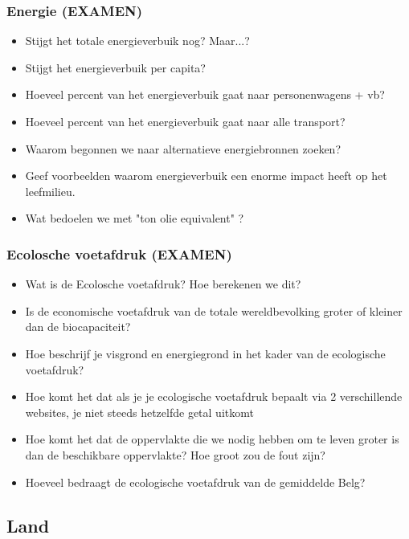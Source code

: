 \documentclass[12pt]{article}
\begin{document}
    \subsubsection*{Energie \textbf{(EXAMEN)}}
    \begin{itemize}
        \item Stijgt het totale energieverbuik nog? Maar...? 
        \item Stijgt het energieverbuik per capita?
        \item Hoeveel percent van het energieverbuik gaat naar personenwagens + vb?
        \item Hoeveel percent van het energieverbuik gaat naar alle transport?
        \item Waarom begonnen we naar alternatieve energiebronnen zoeken?
        \item Geef voorbeelden waarom energieverbuik een enorme impact heeft op het leefmilieu.
        \item Wat bedoelen we met "ton olie equivalent" ?
    \end{itemize}

    \subsubsection*{Ecolosche voetafdruk \textbf{(EXAMEN)}}
    \begin{itemize}
        \item Wat is de Ecolosche voetafdruk? Hoe berekenen we dit?
        \item Is de economische voetafdruk van de totale wereldbevolking groter of kleiner dan de biocapaciteit?
        \item Hoe beschrijf je visgrond en energiegrond in het kader van de ecologische voetafdruk?
        \item Hoe komt het dat als je je ecologische voetafdruk bepaalt via 2 verschillende websites, je niet steeds hetzelfde getal uitkomt
        \item Hoe komt het dat de oppervlakte die we nodig hebben om te leven groter is dan de beschikbare oppervlakte? Hoe groot zou de fout zijn?
        \item Hoeveel bedraagt de ecologische voetafdruk van de gemiddelde Belg?
    \end{itemize}
    

    \subsection{Land}
\end{document}
